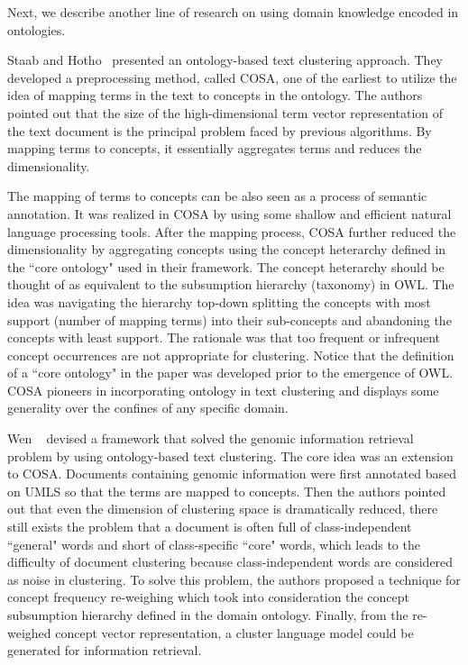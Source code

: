 Next, we describe another line of research on using domain knowledge encoded in ontologies.

Staab and Hotho~\cite{StaabH03} presented an ontology-based text clustering approach. They developed a preprocessing method, called COSA, one of the earliest to utilize the idea of mapping terms in the text to concepts in the ontology. The authors pointed out that the size of the high-dimensional term vector representation of the text document is the principal problem faced by previous algorithms. By mapping terms to concepts, it essentially aggregates terms and reduces the dimensionality.

The mapping of terms to concepts can be also seen as a process of semantic annotation. It was realized in COSA by using some shallow and efficient natural language processing tools. After the mapping process, COSA further reduced the dimensionality by aggregating concepts using the concept heterarchy defined in the ``core ontology" used in their framework. The concept heterarchy should be thought of as equivalent to the subsumption hierarchy (taxonomy) in OWL. The idea was navigating the hierarchy top-down splitting the concepts with most support (number of mapping terms) into their sub-concepts and abandoning the concepts with least support. The rationale was that too frequent or infrequent concept occurrences are not appropriate for clustering. Notice that the definition of a ``core ontology" in the paper was developed prior to the emergence of OWL. COSA pioneers in incorporating ontology in text clustering and displays some generality over the confines of any specific domain.

Wen \etal~\cite{Wen2007Ont} devised a framework that solved the genomic information retrieval problem by using ontology-based text clustering. The core idea was an extension to COSA. Documents containing genomic information were first annotated based on UMLS so that the terms are mapped to concepts. Then the authors pointed out that even the dimension of clustering space is dramatically reduced, there still exists the problem that a document is often full of class-independent ``general" words and short of class-specific ``core" words, which leads to the difficulty of document clustering because class-independent words are considered as noise in clustering. To solve this problem, the authors proposed a technique for concept frequency re-weighing which took into consideration the concept subsumption hierarchy defined in the domain ontology. Finally, from the re-weighed concept vector representation, a cluster language model could be generated for information retrieval.

